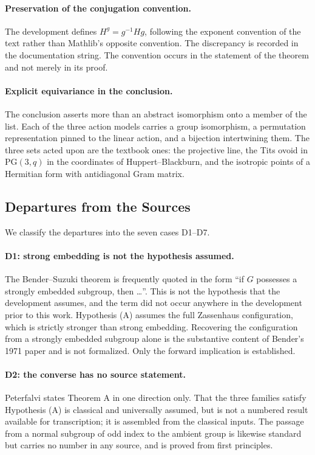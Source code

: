 \documentclass{article}
\begin{document}
\paragraph{Preservation of the conjugation convention.}
The development defines \(H^g=g^{-1}Hg\), following the exponent convention of
the text rather than Mathlib's opposite convention. The discrepancy is recorded
in the documentation string. The convention occurs in the statement of the
theorem and not merely in its proof.

\paragraph{Explicit equivariance in the conclusion.}
The conclusion asserts more than an abstract isomorphism onto a member of the
list. Each of the three action models carries a group isomorphism, a permutation
representation pinned to the linear action, and a bijection intertwining them.
The three sets acted upon are the textbook ones: the projective line, the Tits
ovoid in \(\mathrm{PG}(3,q)\) in the coordinates of Huppert--Blackburn, and the
isotropic points of a Hermitian form with antidiagonal Gram matrix.

\subsection{Departures from the Sources}
\label{sec:departures}

We classify the departures into the seven cases D1--D7.

\paragraph{D1: strong embedding is not the hypothesis assumed.}
The Bender--Suzuki theorem is frequently quoted in the form ``if \(G\) possesses
a strongly embedded subgroup, then \ldots''. This is not the hypothesis that the
development assumes, and the term did not occur anywhere in the development
prior to this work. Hypothesis (A) assumes the full Zassenhaus configuration,
which is strictly stronger than strong embedding. Recovering the configuration
from a strongly embedded subgroup alone is the substantive content of Bender's
1971 paper and is not formalized. Only the forward implication is established.

\paragraph{D2: the converse has no source statement.}
Peterfalvi states Theorem A in one direction only. That the three families
satisfy Hypothesis (A) is classical and universally assumed, but is not a
numbered result available for transcription; it is assembled from the classical
inputs. The passage from a normal subgroup of odd index to the ambient group is
likewise standard but carries no number in any source, and is proved from first
principles.
\end{document}
